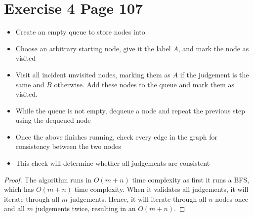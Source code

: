 \documentclass[11pt]{article}
\begin{document}
\section*{Exercise 4 Page 107}
\begin{itemize}
\item Create an empty queue to store nodes into
\item Choose an arbitrary starting node, give it the label $A$, and mark the node as visited
\item Visit all incident unvisited nodes, marking them as $A$ if the judgement is the same and $B$ otherwise. Add these nodes to the queue and mark them as visited.
\item While the queue is not empty, dequeue a node and repeat the previous step using the dequeued node
\item Once the above finishes running, check every edge in the graph for consistency between the two nodes
\item This check will determine whether all judgements are consistent
\end{itemize}
\begin{proof}
The algorithm runs in $O(m+n)$ time complexity as first it runs a BFS, which has $O(m+n)$ time complexity. When it validates all judgements, it will iterate through all $m$ judgements. Hence, it will iterate through all $n$ nodes once and all $m$ judgements twice, resulting in an $O(m+n)$.
\end{proof}
\newpage
\end{document}
